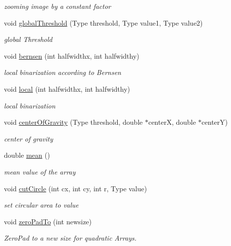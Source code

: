 \begin{DoxyCompactItemize}
\begin{DoxyCompactList}\small\item\em zooming image by a constant factor \end{DoxyCompactList}\item 
void \hyperlink{classArray_a866ce141491864de6db4e4cfd69dae22}{global\+Threshold} (Type threshold, Type value1, Type value2)
\begin{DoxyCompactList}\small\item\em global Threshold \end{DoxyCompactList}\item 
void \hyperlink{classArray_aaa437aa4996fb20c5c43f4cae0d6a9e9}{bernsen} (int halfwidthx, int halfwidthy)
\begin{DoxyCompactList}\small\item\em local binarization according to Bernsen \end{DoxyCompactList}\item 
void \hyperlink{classArray_afb0c07cf4de7b1092fc4053b1aafa015}{local} (int halfwidthx, int halfwidthy)
\begin{DoxyCompactList}\small\item\em local binarization \end{DoxyCompactList}\item 
void \hyperlink{classArray_a5e017adb9aa1e7c0b058f48d8cfcf8cf}{center\+Of\+Gravity} (Type threshold, double $\ast$centerX, double $\ast$centerY)
\begin{DoxyCompactList}\small\item\em center of gravity \end{DoxyCompactList}\item 
double \hyperlink{classArray_ad7db5c43fcfd2040ea242b12982a1c78}{mean} ()
\begin{DoxyCompactList}\small\item\em mean value of the array \end{DoxyCompactList}\item 
void \hyperlink{classArray_a1ef2f1a2b4e681d6a1c208c4a6994bf7}{cut\+Circle} (int cx, int cy, int r, Type value)
\begin{DoxyCompactList}\small\item\em set circular area to value \end{DoxyCompactList}\item 
void \hyperlink{classArray_a88a795239689944e12870e4d182b2407}{zero\+Pad\+To} (int newsize)
\begin{DoxyCompactList}\small\item\em Zero\+Pad to a new size for quadratic Arrays. \end{DoxyCompactList}\item 

\end{DoxyCompactItemize}
